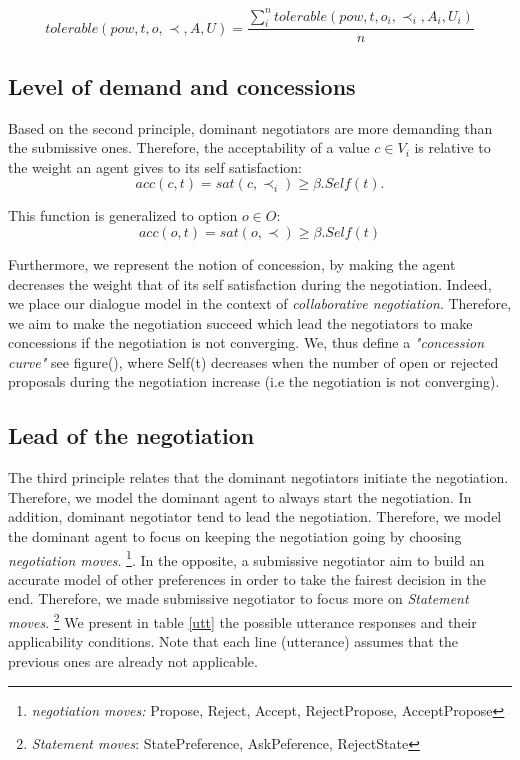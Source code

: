 \documentclass{article}
\begin{document}
	\begin{equation}
	tolerable(pow, t, o, \prec, A, U) = \frac{ \sum_{i}^{n} tolerable(pow, t, o_i, \prec_i, A_i, U_i) } {n}
	\end{equation}
	
	\subsection{Level of demand and concessions}
		Based on the second principle, dominant negotiators are more demanding than the submissive ones. Therefore, the acceptability of a value $c \in V_i$  is relative to the weight an agent gives to its self satisfaction:
				\begin{equation}
				acc(c, t) = sat(c, \prec_i) \geq  \beta . Self(t).
				\end{equation}
				
				This function is generalized to option $o \in O$:
				\begin{equation}
				acc(o, t) = sat(o, \prec) \geq  \beta . Self(t)
				\end{equation}
	
		
		Furthermore, we represent the notion of concession, by making the agent decreases the weight that of its self satisfaction during the negotiation. Indeed, we place our dialogue model in the context of \textit{collaborative negotiation}. Therefore, we aim to make the negotiation succeed which lead the negotiators to make concessions if the negotiation is not converging. We, thus define a \emph{"concession curve"} see figure(), where Self(t) decreases when the number of open or rejected proposals during the negotiation increase (i.e the negotiation is not converging).
		

			

	\subsection{Lead of the negotiation}
		The third principle relates that the dominant negotiators initiate the negotiation. Therefore, we model the dominant agent to always start the negotiation. In addition, dominant negotiator tend to lead the negotiation. Therefore, we model the dominant agent to focus on keeping the negotiation going by choosing \emph{negotiation moves}.  \footnote{\emph{negotiation moves:} Propose, Reject, Accept, RejectPropose, AcceptPropose}.
		In the opposite, a submissive negotiator aim to build an accurate model of other preferences in order to take the fairest decision in the end. Therefore, we made submissive negotiator to focus more on \emph{Statement moves}. \footnote{\emph{Statement moves}: StatePreference, AskPeference, RejectState}
		We present in table \ref{utt} the possible utterance responses and their applicability conditions. Note that each line (utterance) assumes that the previous ones are already not applicable.
	
\end{document}
